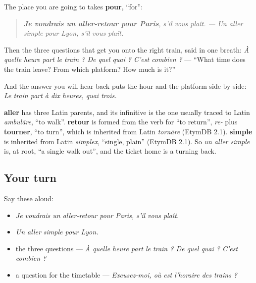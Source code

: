 \begin{grammarlens}[title={Grammar Lens: at the window}]
The place you are going to takes \textbf{pour}, \textquotedblleft{}for\textquotedblright{}:

\begin{quote}
\emph{\textbf{Je voudrais un aller-retour pour Paris}, s'il vous plaît.} \emph{— Un aller simple pour Lyon, s'il vous plaît.}
\end{quote}

Then the three questions that get you onto the right train, said in one breath: \emph{À quelle heure part le train ? De quel quai ? C'est combien ?} — \textquotedblleft{}What time does the train leave? From which platform? How much is it?\textquotedblright{}

And the answer you will hear back puts the hour and the platform side by side: \emph{Le train part à dix heures, quai trois.}
\end{grammarlens}

\begin{cousinweb}
\textbf{aller} has three Latin parents, and its infinitive is the one usually traced to Latin \emph{ambulāre}, \textquotedblleft{}to walk\textquotedblright{}. \textbf{retour} is formed from the verb for \textquotedblleft{}to return\textquotedblright{}, \emph{re-} plus \textbf{tourner}, \textquotedblleft{}to turn\textquotedblright{}, which is inherited from Latin \emph{tornāre} (EtymDB 2.1). \textbf{simple} is inherited from Latin \emph{simplex}, \textquotedblleft{}single, plain\textquotedblright{} (EtymDB 2.1). So \emph{un aller simple} is, at root, \textquotedblleft{}a single walk out\textquotedblright{}, and the ticket home is a turning back.
\end{cousinweb}

\subsection*{Your turn}
Say these aloud:

\begin{itemize}
\raggedright
  \item \emph{Je voudrais un aller-retour pour Paris, s'il vous plaît.}
  \item \emph{Un aller simple pour Lyon.}
  \item the three questions — \emph{À quelle heure part le train ? De quel quai ? C'est combien ?}
  \item a question for the timetable — \emph{Excusez-moi, où est l'horaire des trains ?}
\end{itemize}

